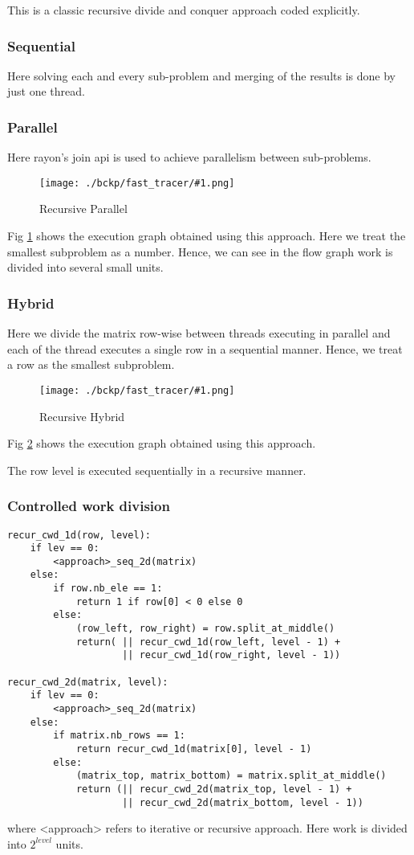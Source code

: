 \documentclass{article}
\newcommand{\loadFig}[2]{{%
\begin{figure}[!ht]
    \texttt{[image: ./bckp/fast\_tracer/\#1.png]}
    \caption{#2}
    \label{#1}
\end{figure}}
}%
\begin{document}
This is a classic recursive divide and conquer approach coded explicitly.

\subsubsection{Sequential}
Here solving each and every sub-problem and merging of the results is done by just one thread.

\subsubsection{Parallel}
Here rayon's join api is used to achieve parallelism between sub-problems.

\loadFig{recur_par_2d}{Recursive Parallel}

Fig \ref{recur_par_2d} shows the execution graph obtained using this approach.
Here we treat the smallest subproblem as a number. Hence, we can see in the flow graph work is divided into several small units.

\subsubsection{Hybrid}
Here we divide the matrix row-wise between threads executing in parallel and each of the thread executes a single row in a sequential manner.
Hence, we treat a row as the smallest subproblem.

\loadFig{recur_hyb_2d}{Recursive Hybrid}

Fig \ref{recur_hyb_2d} shows the execution graph obtained using this approach.

The row level is executed sequentially in a recursive manner.

\subsubsection{Controlled work division}
\begin{lstlisting}[caption = Controlled work division]
recur_cwd_1d(row, level):
    if lev == 0:
        <approach>_seq_2d(matrix)
    else:
        if row.nb_ele == 1:
            return 1 if row[0] < 0 else 0
        else:
            (row_left, row_right) = row.split_at_middle()
            return( || recur_cwd_1d(row_left, level - 1) + 
                    || recur_cwd_1d(row_right, level - 1))

recur_cwd_2d(matrix, level):
    if lev == 0:
        <approach>_seq_2d(matrix)
    else:
        if matrix.nb_rows == 1:
            return recur_cwd_1d(matrix[0], level - 1)
        else:
            (matrix_top, matrix_bottom) = matrix.split_at_middle()
            return (|| recur_cwd_2d(matrix_top, level - 1) + 
                    || recur_cwd_2d(matrix_bottom, level - 1))
\end{lstlisting}
where <approach> refers to iterative or recursive approach.
Here work is divided into $2^{level}$ units.
\end{document}
